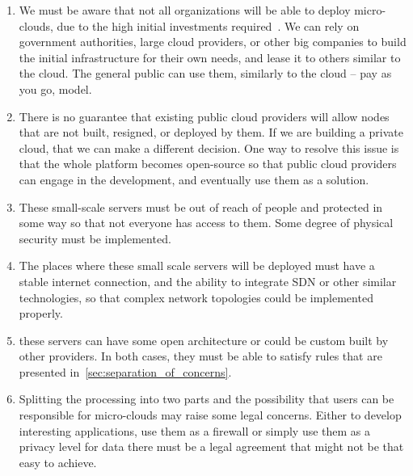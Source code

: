 \begin{enumerate}[start=1,label={(\bfseries \arabic*)}]
	\item We must be aware that not all organizations will be able to deploy micro-clouds, due to the high initial investments required~\cite{MonsalveCC18}. We can rely on government authorities, large cloud providers, or other big companies to build the initial infrastructure for their own needs, and lease it to others similar to the cloud. The general public can use them, similarly to the cloud -- pay as you go, model.
	\item There is no guarantee that existing public cloud providers will allow nodes that are not built, resigned, or deployed by them. If we are building a private cloud, that we can make a different decision. One way to resolve this issue is that the whole platform becomes open-source so that public cloud providers can engage in the development, and eventually use them as a solution.
	\item These small-scale servers must be out of reach of people and protected in some way so that not everyone has access to them. Some degree of physical security must be implemented.
	\item The places where these small scale servers will be deployed must have a stable internet connection, and the ability to integrate SDN or other similar technologies, so that complex network topologies could be implemented properly.
	\item these servers can have some open architecture or could be custom built by other providers. In both cases, they must be able to satisfy rules that are presented in~\ref{sec:separation_of_concerns}.
	\item Splitting the processing into two parts and the possibility that users can be responsible for micro-clouds may raise some legal concerns. Either to develop interesting applications, use them as a firewall or simply use them as a privacy level for data there must be a legal agreement that might not be that easy to achieve.
\end{enumerate}
%
%